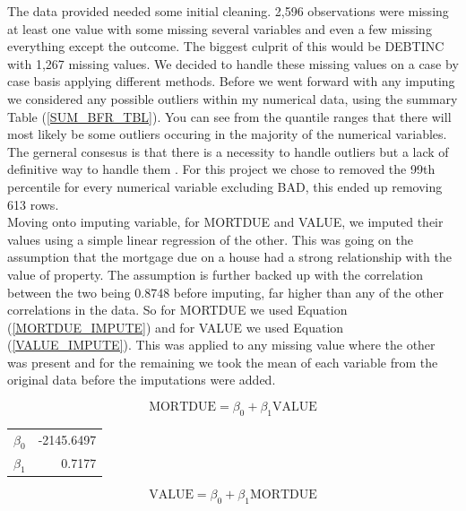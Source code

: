 The data provided needed some initial cleaning. 2,596 observations were missing at least one value with some missing several variables and even a few missing everything except the outcome. The biggest culprit of this would be DEBTINC with 1,267 missing values. We decided to handle these missing values on a case by case basis applying different methods. Before we went forward with any imputing we considered any possible outliers within my numerical data, using the summary Table (\ref{SUM_BFR_TBL}). You can see from the quantile ranges that there will most likely be some outliers occuring in the majority of the numerical variables. The gerneral consesus is that there is a necessity to handle outliers but a lack of definitive way to handle them \parencite{nyitrai2019effects}. For this project we chose to removed the 99th percentile for every numerical variable excluding BAD, this ended up removing 613 rows. \\

Moving onto imputing variable, for MORTDUE and VALUE, we imputed their values using a simple linear regression of the other. This was going on the assumption that the mortgage due on a house had a strong relationship with the value of property. The assumption is further backed up with the correlation between the two being 0.8748 before imputing, far higher than any of the other correlations in the data. So for MORTDUE we used Equation (\ref{MORTDUE_IMPUTE}) and for VALUE we used Equation (\ref{VALUE_IMPUTE}). This was applied to any missing value where the other was present and for the remaining we took the mean of each variable from the original data before the imputations were added.

\begin{equation}\label{MORTDUE_IMPUTE}
\text{MORTDUE} = \beta_{0} + \beta_{1}\text{VALUE}
\end{equation}

\begin{table}[ht]\label{MORTDUE_IMPUTE_COEFS}
	\centering
	\begin{tabular}{lr}
	\hline
	$\beta_{0}$ & -2145.6497 \\
	$\beta_{1}$ & 0.7177 \\
	\hline
	\end{tabular}
\end{table}

\begin{equation}\label{VALUE_IMPUTE}
\text{VALUE} = \beta_{0} + \beta_{1}\text{MORTDUE}
\end{equation}

